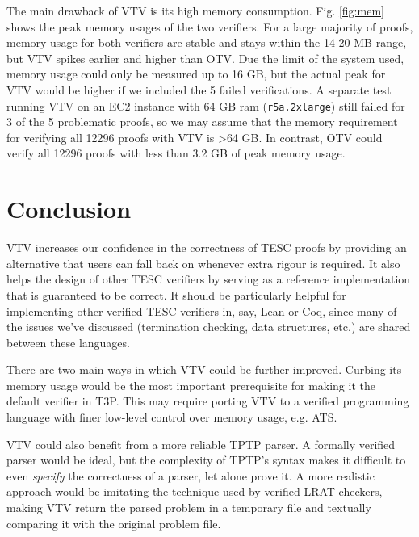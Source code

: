 \documentclass[12pt]{article}
\begin{document}
The main drawback of VTV is its high memory consumption. Fig. \ref{fig:mem} shows
the peak memory usages of the two verifiers. For a large majority of proofs, 
memory usage for both verifiers are stable and stays within the 14-20 MB range,
but VTV spikes earlier and higher than OTV. Due the limit of the system used,
memory usage could only be measured up to 16 GB, but the actual peak for VTV 
would be higher if we included the 5 failed verifications. A separate test running 
VTV on an EC2 instance with 64 GB ram (\texttt{r5a.2xlarge}) still failed for 3 of 
the 5 problematic proofs, so we may assume that the memory requirement 
for verifying all 12296 proofs with VTV is >64 GB. In contrast, OTV could verify all 
12296 proofs with less than 3.2 GB of peak memory usage.



\section{Conclusion}  \label{sec:conclusion}

VTV increases our confidence in the correctness of TESC proofs by providing an 
alternative that users can fall back on whenever extra rigour is required.
It also helps the design of other TESC verifiers by serving as 
a reference implementation that is guaranteed to be correct. It should be 
particularly helpful for implementing other verified TESC verifiers in, say,  
Lean or Coq, since many of the issues we've discussed (termination checking, 
data structures, etc.) are shared between these languages. 

There are two main ways in which VTV could be further improved. Curbing its 
memory usage would be the most important prerequisite for making it the 
default verifier in T3P. This may require porting VTV to a verified programming
language with finer low-level control over memory usage, e.g. ATS.

VTV could also benefit from a more reliable TPTP parser. A formally verified 
parser would be ideal, but the complexity of TPTP's syntax makes it difficult  
to even \textit{specify} the correctness of a parser, let alone prove it. 
A more realistic approach would be imitating the technique used by verified LRAT checkers, 
making VTV return the parsed problem in a temporary file and textually comparing it 
with the original problem file.




\end{document}
